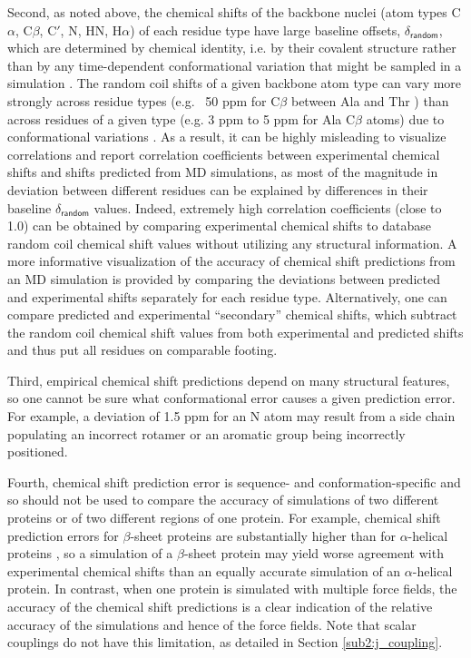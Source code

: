\documentclass[9pt,review]{livecoms}
\begin{document}
Second, as noted above, the chemical shifts of the backbone nuclei (atom types C$\alpha$, C$\beta$, C$'$, N, HN, H$\alpha$) of each residue type have large baseline offsets, $\delta_{\mathsf{random}}$, which are determined by chemical identity, i.e. by their covalent structure rather than by any time-dependent conformational variation that might be sampled in a simulation \cite{schwarzinger_sequence-dependent_2001,de_simone_accurate_2009,tamiola_sequence-specific_2010,kjaergaard_sequence_2011}.
The random coil shifts of a given backbone atom type can vary more strongly across residue types (e.g. ~50 ppm for C$\beta$ between Ala and Thr \cite{kjaergaard_disordered_2012}) than across residues of a given type (e.g. 3 ppm to 5 ppm for Ala C$\beta$ atoms) due to conformational variations \cite{ulrich_biomagresbank_2008,romero_biomagresbank_2020}.
As a result, it can be highly misleading to visualize correlations and report correlation coefficients between experimental chemical shifts and shifts predicted from MD simulations, as most of the magnitude in deviation between different residues can be explained by differences in their baseline $\delta_{\mathsf{random}}$ values.
Indeed, extremely high correlation coefficients (close to 1.0) can be obtained by comparing experimental chemical shifts to database random coil chemical shift values without utilizing any structural information.
A more informative visualization of the accuracy of chemical shift predictions from an MD simulation is provided by comparing the deviations between predicted and experimental shifts separately for each residue type.
Alternatively, one can compare predicted and experimental “secondary” chemical shifts, which subtract the random coil chemical shift values from both experimental and predicted shifts and thus put all residues on comparable footing.

Third, empirical chemical shift predictions depend on many structural features, so one cannot be sure what conformational error causes a given prediction error. For example, a deviation of 1.5 ppm for an N atom may result from a side chain populating an incorrect rotamer or an aromatic group being incorrectly positioned.

Fourth, chemical shift prediction error is sequence- and conformation-specific and so should not be used to compare the accuracy of simulations of two different proteins or of two different regions of one protein.
For example, chemical shift prediction errors for $\beta$-sheet proteins are substantially higher than for $\alpha$-helical proteins \cite{yang_predicting_2021}, so a simulation of a $\beta$-sheet protein may yield worse agreement with experimental chemical shifts than an equally accurate simulation of an $\alpha$-helical protein.
In contrast, when one protein is simulated with multiple force fields, the accuracy of the chemical shift predictions is a clear indication of the relative accuracy of the simulations and hence of the force fields.
Note that scalar couplings do not have this limitation, as detailed in Section \ref{sub2:j_coupling}.
\end{document}
